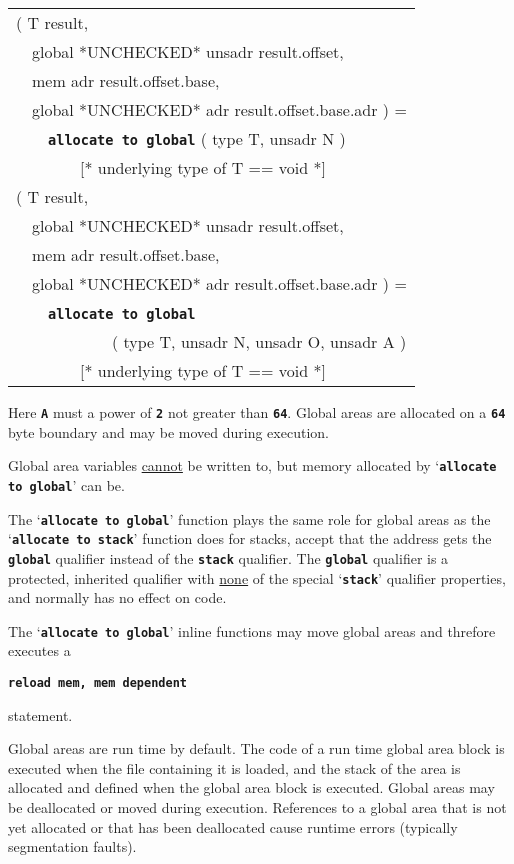 \documentclass[12pt]{article}
\makeatletter
\newcommand{\TT}[1]{{\tt \bfseries #1}}
\newcommand{\ttkey}[1]{\TT{#1}\index{#1@{\tt #1}}}
\newenvironment{indpar}[1][0.3in]%
	{\begin{list}{}%
		     {\setlength{\itemsep}{0in}%
		      \setlength{\topsep}{0in}%
		      \setlength{\parsep}{1ex}%
		      \setlength{\labelwidth}{#1}%
		      \setlength{\leftmargin}{#1}%
		      \addtolength{\leftmargin}{\labelsep}}%
	 \item}%
	{\end{list}}
\makeatother
\begin{document}
\begin{indpar}\tt\begin{tabular}{l}
( T result, \\
~~global *UNCHECKED* unsadr result.offset, \\
~~mem adr result.offset.base, \\
~~global *UNCHECKED* adr result.offset.base.adr  ) = \\
~~~~\ttkey{allocate to global} ( type T, unsadr N ) \\
~~~~~~~~[* underlying type of T == void *]
\\[1ex]
( T result, \\
~~global *UNCHECKED* unsadr result.offset, \\
~~mem adr result.offset.base, \\
~~global *UNCHECKED* adr result.offset.base.adr  ) = \\
~~~~\ttkey{allocate to global} \\
~~~~~~~~~~~~( type T, unsadr N, unsadr O, unsadr A ) \\
~~~~~~~~[* underlying type of T == void *]
\end{tabular}\end{indpar}\label{ALLOCATE-TO-GLOBAL}

Here \TT{A} must a power of \TT{2} not greater than \TT{64}.
Global areas are allocated on a \TT{64} byte boundary and
may be moved during execution.

Global area variables \underline{cannot} be written to, but memory allocated
by `\TT{allocate to global}' can be.

The `\TT{allocate to global}' function plays the same role for
global areas as the `\TT{allocate to stack}' function does for
stacks, accept that the address gets the \TT{global} qualifier
instead of the \TT{stack} qualifier.  The \TT{global} qualifier
is a protected, inherited qualifier
with \underline{none} of the special `\TT{stack}'
qualifier properties, and normally has no effect on code.

The `\TT{allocate to global}' inline functions may move
global areas and threfore executes a
\begin{center}
\TT{reload mem, mem dependent}
\end{center}
statement.

Global areas are run time by default.
The code of a run time
global area block is executed when the file containing it is
loaded, and the stack of the area is allocated and defined when
the global area block is executed.
Global areas may be deallocated or moved during execution.
References to a global area
that is not yet allocated or that has been deallocated cause runtime
errors (typically segmentation faults).
\end{document}
